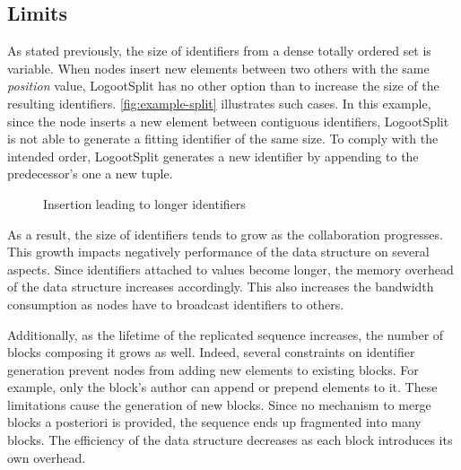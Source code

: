 \documentclass[sigplan,10pt]{acmart}
\newcommand{\trm}[1]{\mathit{#1}}
\newcommand{\id}[3]{$\trm{#1}^{\trm{#2}}_{\trm{#3}}$}
\newcommand{\widthletter}{7mm}
\begin{document}
\subsection{Limits}

As stated previously, the size of identifiers from a dense totally ordered set is variable.
When nodes insert new elements between two others with the same \emph{position} value, LogootSplit has no other option than to increase the size of the resulting identifiers.
\autoref{fig:example-split} illustrates such cases.
In this example, since the node inserts a new element between contiguous identifiers, LogootSplit is not able to generate a fitting identifier of the same size.
To comply with the intended order, LogootSplit generates a new identifier by appending to the predecessor's one a new tuple.

\begin{figure}[ht!]
    \centering
    \caption{Insertion leading to longer identifiers}
    \label{fig:example-split}
\end{figure}

As a result, the size of identifiers tends to grow as the collaboration progresses.
This growth impacts negatively performance of the data structure on several aspects.
Since identifiers attached to values become longer, the memory overhead of the data structure increases accordingly.
This also increases the bandwidth consumption as nodes have to broadcast identifiers to others.

Additionally, as the lifetime of the replicated sequence increases, the number of blocks composing it grows as well.
Indeed, several constraints on identifier generation prevent nodes from adding new elements to existing blocks.
For example, only the block's author can append or prepend elements to it.
These limitations cause the generation of new blocks.
Since no mechanism to merge blocks a posteriori is provided, the sequence ends up fragmented into many blocks.
The efficiency of the data structure decreases as each block introduces its own overhead.
\end{document}
